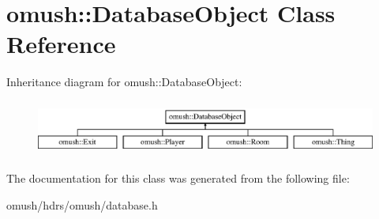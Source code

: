 \hypertarget{classomush_1_1_database_object}{\section{omush\-:\-:Database\-Object Class Reference}
\label{classomush_1_1_database_object}
}
Inheritance diagram for omush\-:\-:Database\-Object\-:\begin{figure}[H]
\begin{center}
\leavevmode
\includegraphics[height=1.842105cm]{classomush_1_1_database_object}
\end{center}
\end{figure}


The documentation for this class was generated from the following file\-:\begin{DoxyCompactItemize}
\item 
omush/hdrs/omush/database.\-h\end{DoxyCompactItemize}

